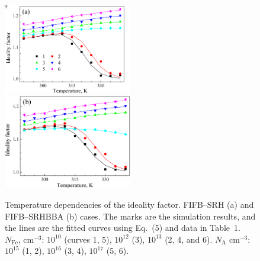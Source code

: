 \documentclass [sort&compress] {elsarticle}
\begin{document}
\begin{figure}
\includegraphics[width=0.5\textwidth]{FigS6a}%
\includegraphics[width=0.5\textwidth]{FigS6b}
\caption{\label{figS6}
Temperature dependencies of the ideality factor.
FIFB--SRH (a) and FIFB--SRHBBA (b) cases.
The marks are the simulation results, and the lines are the fitted curves using Eq.~(5) and data in Table~1.
$N_\mathrm{Fe}$, cm$^{-3}$: $10^{10}$ (curves 1, 5), $10^{12}$ (3), $10^{13}$ (2, 4, and 6).
$N_\mathrm{A}$ cm$^{-3}$: $10^{15}$ (1, 2), $10^{16}$ (3,  4), $10^{17}$ (5, 6).
}%
\end{figure}
\end{document}

